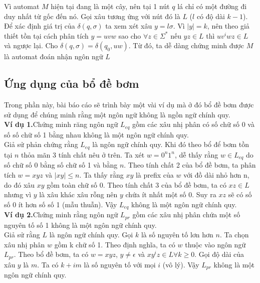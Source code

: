 \documentclass[14pt]{extreport}
\begin{document}
Vì automat $M$ hiện tại đang là một cây, nên tại 1 nút $q$ lá chỉ có một đường đi duy nhất từ gốc đến nó. Gọi xâu tương ứng với nút đó là $L$ ($l$ có độ dài $k-1$). Để xác định giá trị của $\delta(q, \sigma)$ ta xem xét xâu $y = l\sigma $. Vì $|y| = k$, nên theo giả thiết tồn tại cách phân tích $y = uvw$ sao cho $\forall z \in \Sigma^*$ nếu $yz \in L$ thì $uv^iwz \in L$ và ngược lại. Cho $\delta(q, \sigma) = \delta(q_0, uw)$. Từ đó, ta dễ dàng chứng minh được $M$ là automat đoán nhận ngôn ngữ $L$

\subsection{Ứng dụng của bổ đề bơm}
Trong phần này, bài báo cáo sẽ trình bày một vài ví dụ mà ở đó bổ đề bơm được sử dụng để chúng minh rằng một ngôn ngữ không là ngồn ngữ chính quy.\\
\textbf{Ví dụ 1.}Chứng minh răng ngôn ngữ $L_{eq}$ gồm các xâu nhị phân có số chữ số 0 và số số chữ số 1 bằng nhau không là một ngôn ngữ chính quy. \\
Giả sử phản chứng rằng $L_{eq}$ là ngôn ngữ chính quy. Khi đó theo bổ để bơm tồn tại $n$ thỏa mãn 3 tính chất nêu ở trên. Ta xét $w = 0^n 1^n$, dễ thấy rằng $w \in L_{eq}$ do số chữ số 0 bằng số chữ số 1 và bằng $n$. Theo tính chất 2 của bổ đề bơm, ta phân tích $w = xyz$ và $|xy| \leq n$. Ta thấy rằng $xy$ là prefix của $w$ với đồ dài nhỏ hơn n, do đó xâu $xy$ gồm toàn chữ số 0. Theo tính chất 3 của bổ đề bơm, ta có $xz \in L$ nhưng vì $y$ là xâu khác xâu rỗng nên $y$ chứa ít nhất một số 0. Suy ra $xz$ sẽ có số số 0 ít hơn số số 1 (mẫu thuẫn). Vậy $L_{eq}$ không là một ngôn ngữ chính quy.\\
\textbf{Ví dụ 2.}Chứng minh rằng ngôn ngữ $L_{pr}$ gồm các xâu nhị phân chứa một số nguyên tố số 1 không là một ngôn ngữ chính quy. \\
Giả sử rằng $L$ là ngôn ngữ chính quy. Gọi $k$ là số nguyên tố lơn hơn $n$. Ta chọn xâu nhị phân $w$ gồm k chữ số 1. Theo định nghĩa, ta có $w$ thuộc vào ngôn ngữ $L_{pr}$. Theo bổ đề bơm, ta có $w = xyz$, $y \neq \epsilon$ và $xy^iz \in L \forall k \geq 0$. Gọi độ dài của xâu $y$ là $m$. Ta có $k + im$ là số nguyên tố với mọi $i$ (vô lý). Vậy $L_{pr}$ không là một ngôn ngữ chính quy.
\end{document}
